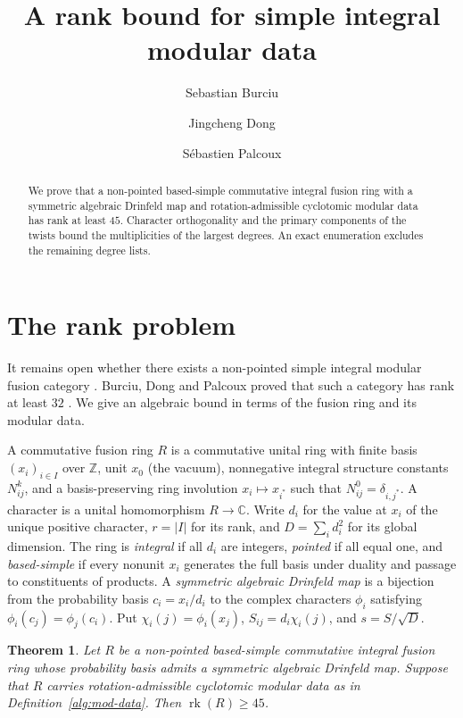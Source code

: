 \documentclass[11pt]{amsart}
\title[A rank bound for simple integral modular data]{A rank bound for simple integral modular data}
\author{Sebastian Burciu}
\author{Jingcheng Dong}
\author{S\'ebastien Palcoux}
\date{}
\numberwithin{equation}{section}
\theoremstyle{definition}
\theoremstyle{plain}
\newtheorem{mainthm}{Theorem}
\newcommand{\ZZ}{\mathbb Z}
\begin{document}
\begin{abstract}
We prove that a non-pointed based-simple commutative integral fusion ring with a symmetric algebraic Drinfeld map and rotation-admissible cyclotomic modular data has rank at least $45$. Character orthogonality and the primary components of the twists bound the multiplicities of the largest degrees. An exact enumeration excludes the remaining degree lists.
\end{abstract}
\maketitle

\section{The rank problem}
It remains open whether there exists a non-pointed simple integral modular fusion category \cite[Question~1.3 and Theorem~5.8]{LPR}. Burciu, Dong and Palcoux proved that such a category has rank at least $32$ \cite[Theorem~22.2]{BDPcore}. We give an algebraic bound in terms of the fusion ring and its modular data.

\smallskip\noindent
A commutative fusion ring $R$ is a commutative unital ring with finite
basis $(x_i)_{i\in I}$ over $\ZZ$, unit $x_0$ (the vacuum), nonnegative integral
structure constants $N_{ij}^k$, and a basis-preserving ring involution
$x_i\mapsto x_{i^*}$ such that $N_{ij}^0=\delta_{i,j^*}$.
A character is a unital homomorphism $R\to\mathbb C$. Write $d_i$ for the value at $x_i$ of the unique positive character,
$r=|I|$ for its rank, and $D=\sum_i d_i^2$ for its global dimension.
The ring is \emph{integral} if all $d_i$ are integers, \emph{pointed}
if all equal one, and \emph{based-simple} if every nonunit $x_i$
generates the full basis under duality and passage to constituents of
products. A \emph{symmetric algebraic Drinfeld map} is a bijection
from the probability basis $c_i=x_i/d_i$ to the complex characters
$\phi_i$ satisfying $\phi_i(c_j)=\phi_j(c_i)$. Put
$\chi_i(j)=\phi_i(x_j)$, $S_{ij}=d_i\chi_i(j)$, and $s=S/\sqrt D$.

\begin{mainthm}\label{alg:rank}
Let $R$ be a non-pointed based-simple commutative integral fusion ring whose probability basis admits a symmetric algebraic Drinfeld map. Suppose that $R$ carries rotation-admissible cyclotomic modular data as in Definition~\ref{alg:mod-data}. Then $\operatorname{rk}(R)\ge45$.
\end{mainthm}
\end{document}
